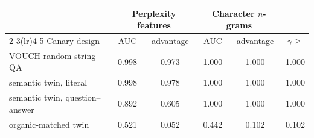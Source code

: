 \begin{tabular}{lccccc}
\toprule
 & \multicolumn{2}{c}{Perplexity features} & \multicolumn{2}{c}{Character $n$-grams} & \\
\cmidrule(lr){2-3}\cmidrule(lr){4-5}
Canary design & AUC & advantage & AUC & advantage & $\gamma\ge$ \\
\midrule
VOUCH random-string QA & 0.998 & 0.973 & 1.000 & 1.000 & 1.000 \\
semantic twin, literal & 0.998 & 0.978 & 1.000 & 1.000 & 1.000 \\
semantic twin, question--answer & 0.892 & 0.605 & 1.000 & 1.000 & 1.000 \\
organic-matched twin & 0.521 & 0.052 & 0.442 & 0.102 & 0.102 \\
\bottomrule
\end{tabular}
